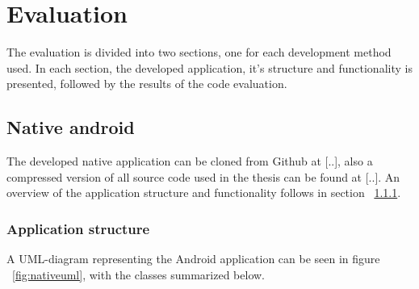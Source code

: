 \chapter{Evaluation}	
The evaluation is divided into two sections, one for each development method used. In each section, the developed application, it's structure and functionality is presented, followed by the results of the code evaluation. 

\section{Native android} \label{android}
The developed native application can be cloned from Github at [..], also a compressed version of all source code used in the thesis can be found at [..]. An overview of the application structure and functionality follows in section ~\ref{sec:nativestructure}. 

\subsection{Application structure} \label{sec:nativestructure}
A UML-diagram representing the Android application can be seen in figure ~\ref{fig:nativeuml}, with the classes summarized below.

